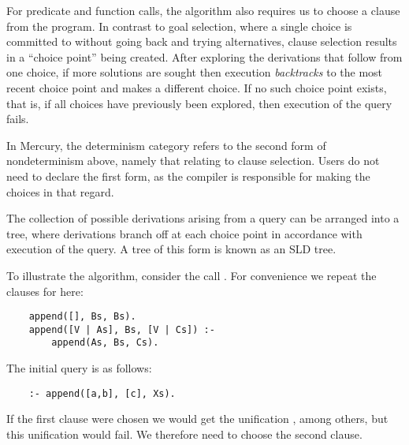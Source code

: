 For predicate and function calls,
the algorithm also requires us to choose a clause from the program.
In contrast to goal selection,
where a single choice is committed to
without going back and trying alternatives,
clause selection results in a ``choice point\label{gi:choice-point}''
being created.
After exploring the derivations that follow from one choice,
if more solutions are sought then
execution \emph{backtracks\label{gi:backtrack}}
to the most recent choice point
and makes a different choice.
If no such choice point exists,
that is, if all choices have previously been explored,
then execution of the query fails\label{gi:failure2}.

In Mercury,
the  determinism category
refers to the second form of nondeterminism above,
namely that relating to clause selection.
Users do not need to declare the first form,
as the compiler is responsible for making the choices in that regard.

The collection of possible derivations arising from a query
can be arranged into a tree,
where derivations branch off at each choice point
in accordance with execution of the query.
A tree of this form is known as an SLD tree\label{gi:sld-tree}.

To illustrate the algorithm,
consider the call .
For convenience we repeat the clauses for  here:
\begin{verbatim}
    append([], Bs, Bs).
    append([V | As], Bs, [V | Cs]) :-
        append(As, Bs, Cs).
\end{verbatim}
The initial query is as follows:
\begin{verbatim}
    :- append([a,b], [c], Xs).
\end{verbatim}
If the first clause were chosen
we would get the unification \co{[a,b] = []},
among others,
but this unification would fail.
We therefore need to choose the second clause.

